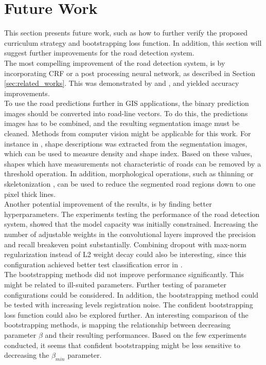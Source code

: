 \section{Future Work}
\label{sec:futureWork}
This section presents future work, such as how to further verify the proposed curriculum strategy and bootstrapping loss function. In addition, this section will suggest further improvements for the road detection system.\\

The most compelling improvement of the road detection system, is by incorporating \ac{CRF} or a post processing neural network, as described in Section \ref{sec:related_works}. This was demonstrated by \cite{Kluckner_semantic_height} and \cite{Mnih_aerial_images_noisy}, and yielded accuracy improvements. \\

To use the road predictions further in GIS applications, the binary prediction images should be converted into road-line vectors. To do this, the predictions images has to be combined, and the resulting segmentation image must be cleaned. Methods from computer vision might be applicable for this work. For instance in \citep{Song_road_extraction_svm}, shape descriptions was extracted from the segmentation images, which can be used to measure density and shape index. Based on these values, shapes which have measurements not characteristic of roads can be removed by a threshold operation. In addition, morphological operations, such as thinning or skeletonization , can be used to reduce the segmented road regions down to one pixel thick lines.\\

Another potential improvement of the results, is by finding better hyperparameters. The experiments testing the performance of the road detection system, showed that the model capacity was initially constrained. Increasing the number of adjustable weights in the convolutional layers improved the precision and recall breakeven point substantially. Combining dropout with max-norm regularization instead of L2 weight decay could also be interesting, since this configuration achieved better test classification error in \citep{Srivastava_dropout}.\\

The bootstrapping methods did not improve performance significantly. This might be related to ill-suited parameters. Further testing of parameter configurations could be considered. In addition, the bootstrapping method could be tested with increasing levels registration noise. The confident bootstrapping loss function could also be explored further. An interesting comparison of the bootstrapping methods, is mapping the relationship between decreasing parameter $\beta$ and their resulting performances. Based on the few experiments conducted, it seems that confident bootstrapping might be less sensitive to decreasing the $\beta_{min}$ parameter.\\

